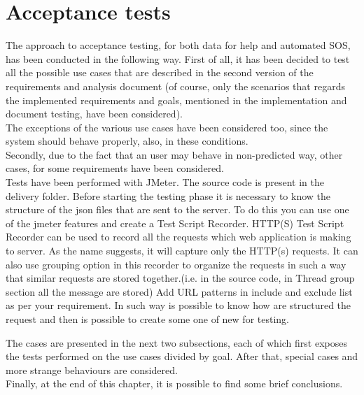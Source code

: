 \section{Acceptance tests}
The approach to acceptance testing, for both data for help and automated SOS, has been
conducted in the following way. 
First of all, it has been decided to test all the possible use cases that are described in the
second version of the requirements and analysis document (of course, only the scenarios that
regards the implemented requirements and goals, mentioned in the implementation and document testing, have been considered). \\
The exceptions of the various use cases have been considered too, since the system should
behave properly, also, in these conditions. \\
Secondly, due to the fact that an user may behave in non-predicted way, other cases, for some
requirements have been considered. \\

Tests have been performed with JMeter. The source code is present in the delivery folder. 
Before starting the testing phase it is necessary to know the structure of the json files that are sent to the server. To do this you can use
one of the jmeter features and create a Test Script Recorder. HTTP(S) Test Script Recorder can be used to record all the requests which web
application is making to server. As the name suggests, it will capture only the HTTP(s) requests. It can also use grouping option in this
recorder to organize the requests in such a way that similar requests are stored together.(i.e. in the source code, in Thread group section
all the message are stored) Add URL patterns in include and exclude list as per your requirement. In such way is possible to know how are
structured the request and then is possible to create some one of new for testing.

\par
The cases are presented in the next two subsections, each of which first exposes the
tests performed on the use cases divided by goal. After that, special cases and more strange
behaviours are considered. \\
Finally, at the end of this chapter, it is possible to find some brief conclusions. 




